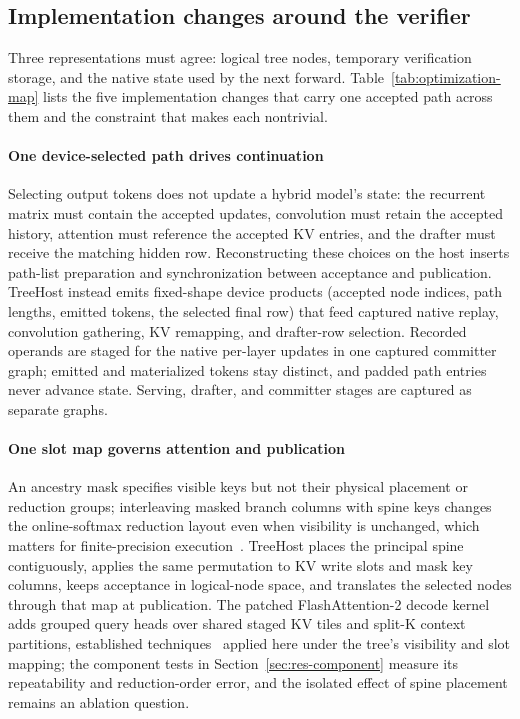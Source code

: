 \documentclass[sigconf,anonymous,review]{acmart}
\newcommand{\sys}{TreeHost}
\begin{document}
\subsection{Implementation changes around the verifier}
Three representations must agree: logical tree nodes, temporary verification storage, and the native state used by the next forward. Table~\ref{tab:optimization-map} lists the five implementation changes that carry one accepted path across them and the constraint that makes each nontrivial. \paragraph{One device-selected path drives continuation} Selecting output tokens does not update a hybrid model's state: the recurrent matrix must contain the accepted updates, convolution must retain the accepted history, attention must reference the accepted KV entries, and the drafter must receive the matching hidden row. Reconstructing these choices on the host inserts path-list preparation and synchronization between acceptance and publication. \sys{} instead emits fixed-shape device products (accepted node indices, path lengths, emitted tokens, the selected final row) that feed captured native replay, convolution gathering, KV remapping, and drafter-row selection. Recorded operands are staged for the native per-layer updates in one captured committer graph; emitted and materialized tokens stay distinct, and padded path entries never advance state. Serving, drafter, and committer stages are captured as separate graphs.

\paragraph{One slot map governs attention and publication} An ancestry mask specifies visible keys but not their physical placement or reduction groups; interleaving masked branch columns with spine keys changes the online-softmax reduction layout even when visibility is unchanged, which matters for finite-precision execution~\cite{he2025determinism}. \sys{} places the principal spine contiguously, applies the same permutation to KV write slots and mask key columns, keeps acceptance in logical-node space, and translates the selected nodes through that map at publication. The patched FlashAttention-2 decode kernel adds grouped query heads over shared staged KV tiles and split-K context partitions, established techniques~\cite{yao2024deft,pan2025fasttree} applied here under the tree's visibility and slot mapping; the component tests in Section~\ref{sec:res-component} measure its repeatability and reduction-order error, and the isolated effect of spine placement remains an ablation question.
\end{document}
